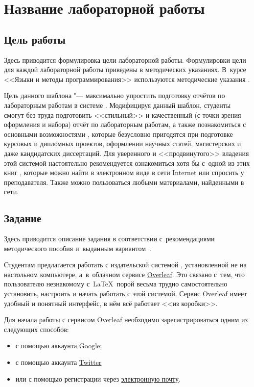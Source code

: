 \chapter{Название лабораторной работы}

\section{Цель работы}
Здесь приводится формулировка цели лабораторной работы. Формулировки цели для каждой лабораторной работы приведены в методических указаниях. 
В~курсе <<Языки и методы программирования>> используются методические указания \cite{gutgut:1, gutgut:2}.

Цель данного шаблона "--- максимально упростить подготовку отчётов по лабораторным работам в системе \href{https://ru.wikipedia.org/wiki/LaTeX}{\LaTeXe}. 
Модифицируя данный шаблон, студенты смогут без труда подготовить <<стильный>> и качественный (с точки зрения оформления и набора) отчёт по лабораторным работам, а также познакомиться с основными возможностями \LaTeXe, которые безусловно пригодятся при подготовке курсовых и дипломных проектов, оформлении научных статей, магистерских и даже кандидатских диссертаций. 
Для уверенного и <<продвинутого>> владения этой системой настоятельно рекомендуется ознакомиться хотя бы с~одной из этих книг \cite{latex:b1,latex:b2,latex:b3}, которые можно найти в электронном виде в сети Internet или спросить у преподавателя. 
Также можно пользоваться любыми материалами, найденными в сети.

\section{Задание}
Здесь приводится описание задания в соответствии с~рекомендациями методического пособия и~выданным вариантом~\cite{gutgut:1, gutgut:2}.

Студентам предлагается работать с издательской системой \LaTeXe, установленной не на настольном компьютере, а~в~облачном сервисе \href{http://www.overleaf.com}{Overleaf}. 
Это связано с~тем, что пользователю незнакомому с~\LaTeX\ порой весьма трудно самостоятельно установить, настроить и начать работать с этой системой.
Сервис \href{http://www.overleaf.com}{Overleaf} имеет удобный и понятный интерфейс, в нём всё работает <<из коробки>>.

Для начала работы с сервисом \href{http://www.overleaf.com}{Overleaf}  необходимо зарегистрироваться одним из следующих способов: 
\begin{itemize}
\item с помощью аккаунта \href{https://www.overleaf.com/users/auth/google_oauth2?intent=sign_up?ref=21785d9c7b53}{Google};
\item с помощью аккаунта \href{https://www.overleaf.com/users/auth/twitter?intent=sign_up?ref=21785d9c7b53}{Twitter}
\item или с помощью регистрации через  \href{https://www.overleaf.com/signup?ref=21785d9c7b53}{электронную почту}.
\end{itemize}


